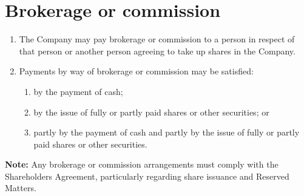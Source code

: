 \section{Brokerage or commission}

\begin{enumerate}[label=(\alph*)]
    \item The Company may pay brokerage or commission to a person in respect of that person or another person agreeing to take up shares in the Company.
    
    \item Payments by way of brokerage or commission may be satisfied:
    \begin{enumerate}[label=(\roman*)]
        \item by the payment of cash;
        \item by the issue of fully or partly paid shares or other securities; or
        \item partly by the payment of cash and partly by the issue of fully or partly paid shares or other securities.
    \end{enumerate}
\end{enumerate}

\textbf{Note:} Any brokerage or commission arrangements must comply with the Shareholders Agreement, particularly regarding share issuance and Reserved Matters. 